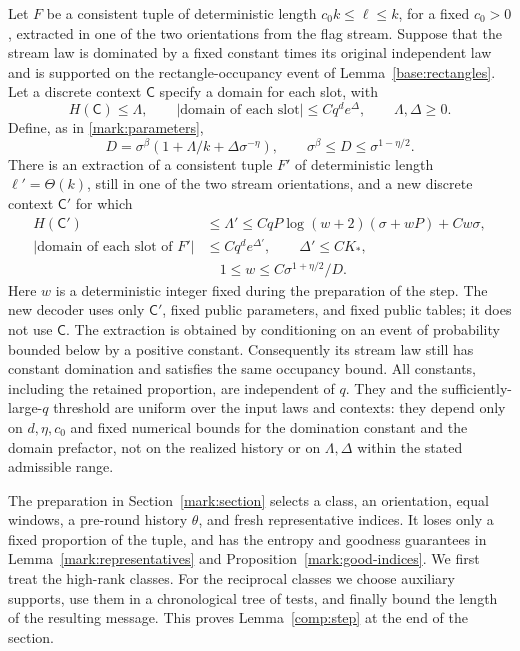 \begin{lemma}\label{comp:step}
Let \(F\) be a consistent tuple of deterministic length
\(c_0k\le \ell\le k\), for a fixed \(c_0>0\), extracted in one of the two
orientations from the flag stream. Suppose that the stream law is
dominated by a fixed constant times its original independent law and
is supported on the rectangle-occupancy event of
Lemma~\ref{base:rectangles}.
Let a discrete context \(\mathsf C\) specify a domain for each slot, with
\[
 H(\mathsf C)\le\Lambda,\qquad
 |\text{domain of each slot}|\le Cq^d e^\Delta,
 \qquad \Lambda,\Delta\ge0.
\]
Define, as in \eqref{mark:parameters},
\[
 D=\sigma^\beta(1+\Lambda/k+\Delta\sigma^{-\eta}),
 \qquad \sigma^\beta\le D\le\sigma^{1-\eta/2}.
\]
There is an extraction of a consistent tuple \(F'\) of deterministic
length \(\ell'=\Theta(k)\), still in one of the two stream orientations,
and a new discrete context \(\mathsf C'\) for which
\begin{equation}\label{comp:step-bounds}
\begin{split}
 H(\mathsf C')&\le\Lambda'
     \le CqP\log(w+2)(\sigma+wP)+Cw\sigma,\\
 |\text{domain of each slot of }F'|
     &\le Cq^d e^{\Delta'},\qquad
       \Delta'\le CK_*,\\
 &\hspace{1em}1\le w\le C\sigma^{1+\eta/2}/D.
\end{split}
\end{equation}
Here \(w\) is a deterministic integer fixed during the preparation of
the step. The new decoder uses only \(\mathsf C'\), fixed public
parameters, and fixed public tables; it does not use \(\mathsf C\).
The extraction is obtained by conditioning on an event of probability
bounded below by a positive constant. Consequently its stream law
still has constant domination and satisfies the same occupancy bound.
All constants, including the retained proportion, are independent of
\(q\). They and the sufficiently-large-\(q\) threshold are uniform
over the input laws and contexts: they depend only on \(d,\eta,c_0\)
and fixed numerical bounds for the domination constant and the
domain prefactor, not on the realized history or on \(\Lambda,\Delta\)
within the stated admissible range.
\end{lemma}

The preparation in Section~\ref{mark:section} selects a class, an
orientation, equal windows, a pre-round history \(\theta\), and fresh
representative indices. It loses only a fixed proportion of the tuple,
and has the entropy and goodness guarantees in
Lemma~\ref{mark:representatives} and
Proposition~\ref{mark:good-indices}.
We first treat the high-rank classes. For the reciprocal classes we
choose auxiliary supports, use them in a chronological tree of tests,
and finally bound the length of the resulting message. This proves
Lemma~\ref{comp:step} at the end of the section.

